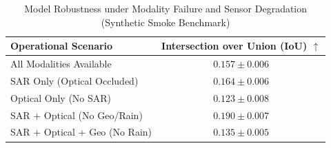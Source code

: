 \begin{table}[h]
\centering
\caption{Model Robustness under Modality Failure and Sensor Degradation (Synthetic Smoke Benchmark)}
\label{tab:robustness}
\begin{tabular}{lc}
\toprule
Operational Scenario & Intersection over Union (IoU) $\uparrow$ \\
\midrule
All Modalities Available & $0.157 \pm 0.006$ \\
SAR Only (Optical Occluded) & $0.164 \pm 0.006$ \\
Optical Only (No SAR) & $0.123 \pm 0.008$ \\
SAR + Optical (No Geo/Rain) & $0.190 \pm 0.007$ \\
SAR + Optical + Geo (No Rain) & $0.135 \pm 0.005$ \\
\bottomrule
\end{tabular}
\end{table}